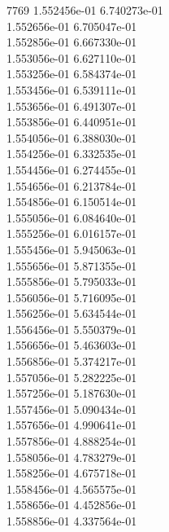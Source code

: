 7769	1.552456e-01	6.740273e-01	\\ 	1.552656e-01	6.705047e-01	\\ 	1.552856e-01	6.667330e-01	\\ 	1.553056e-01	6.627110e-01	\\ 	1.553256e-01	6.584374e-01	\\ 	1.553456e-01	6.539111e-01	\\ 	1.553656e-01	6.491307e-01	\\ 	1.553856e-01	6.440951e-01	\\ 	1.554056e-01	6.388030e-01	\\ 	1.554256e-01	6.332535e-01	\\ 	1.554456e-01	6.274455e-01	\\ 	1.554656e-01	6.213784e-01	\\ 	1.554856e-01	6.150514e-01	\\ 	1.555056e-01	6.084640e-01	\\ 	1.555256e-01	6.016157e-01	\\ 	1.555456e-01	5.945063e-01	\\ 	1.555656e-01	5.871355e-01	\\ 	1.555856e-01	5.795033e-01	\\ 	1.556056e-01	5.716095e-01	\\ 	1.556256e-01	5.634544e-01	\\ 	1.556456e-01	5.550379e-01	\\ 	1.556656e-01	5.463603e-01	\\ 	1.556856e-01	5.374217e-01	\\ 	1.557056e-01	5.282225e-01	\\ 	1.557256e-01	5.187630e-01	\\ 	1.557456e-01	5.090434e-01	\\ 	1.557656e-01	4.990641e-01	\\ 	1.557856e-01	4.888254e-01	\\ 	1.558056e-01	4.783279e-01	\\ 	1.558256e-01	4.675718e-01	\\ 	1.558456e-01	4.565575e-01	\\ 	1.558656e-01	4.452856e-01	\\ 	1.558856e-01	4.337564e-01	\\ \hline
